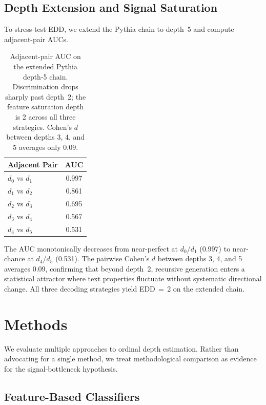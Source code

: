 \documentclass[11pt,a4paper]{article}
\begin{document}
\subsection{Depth Extension and Signal Saturation}
\label{sec:depth_extension}

To stress-test EDD, we extend the Pythia chain to depth~5 and compute adjacent-pair AUCs.

\begin{table}[t]
\centering
\small
\begin{tabular}{lc}
\toprule
\textbf{Adjacent Pair} & \textbf{AUC} \\
\midrule
$d_0$ vs $d_1$ & 0.997 \\
$d_1$ vs $d_2$ & 0.861 \\
$d_2$ vs $d_3$ & 0.695 \\
$d_3$ vs $d_4$ & 0.567 \\
$d_4$ vs $d_5$ & 0.531 \\
\bottomrule
\end{tabular}
\caption{Adjacent-pair AUC on the extended Pythia depth-5 chain. Discrimination drops sharply past depth~2; the feature saturation depth is 2 across all three strategies. Cohen's $d$ between depths 3, 4, and 5 averages only 0.09.}
\label{tab:extended_auc}
\end{table}

The AUC monotonically decreases from near-perfect at $d_0$/$d_1$ (0.997) to near-chance at $d_4$/$d_5$ (0.531).
The pairwise Cohen's $d$ between depths 3, 4, and 5 averages 0.09, confirming that beyond depth~2, recursive generation enters a statistical attractor where text properties fluctuate without systematic directional change.
All three decoding strategies yield EDD\,$=$\,2 on the extended chain.

\section{Methods}
\label{sec:methods}

We evaluate multiple approaches to ordinal depth estimation.
Rather than advocating for a single method, we treat methodological comparison as evidence for the signal-bottleneck hypothesis.

\subsection{Feature-Based Classifiers}
\end{document}
